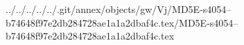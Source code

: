 ../../../../../.git/annex/objects/gw/Vj/MD5E-s4054--b74648f97e2db284728ae1a1a2dbaf4c.tex/MD5E-s4054--b74648f97e2db284728ae1a1a2dbaf4c.tex